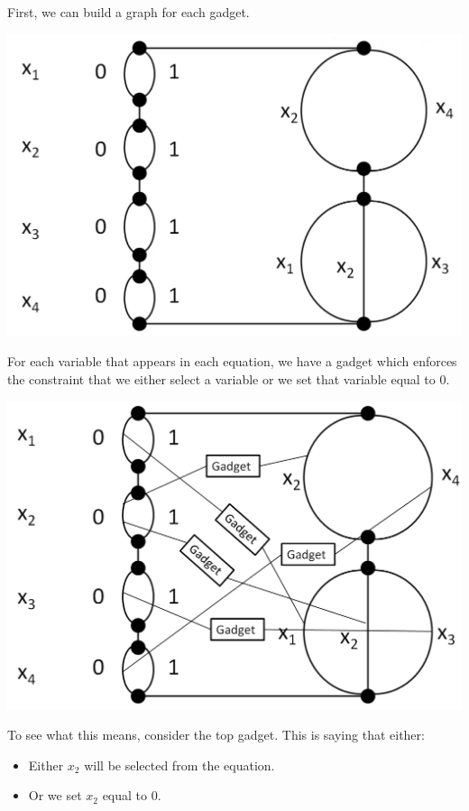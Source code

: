 \documentclass[letterpaper]{article}
\begin{document}
First, we can build a graph for each gadget. 
\begin{center}
    \includegraphics[scale=0.30]{../assets/zoe_ham_12.png}
\end{center} 
For each variable that appears in each equation, we have a gadget which enforces the constraint that we either select a variable or we set that variable equal to 0. 
\begin{center}
    \includegraphics[scale=0.30]{../assets/zoe_ham_11.png}
\end{center} 
To see what this means, consider the top gadget. This is saying that either: 
\begin{itemize}
    \item Either $x_2$ will be selected from the equation. 
    \item Or we set $x_2$ equal to 0. 
\end{itemize}
\end{document}
